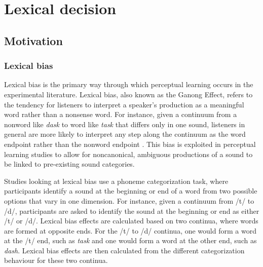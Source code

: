 
\chapter{Lexical decision}


\section{Motivation}

\subsection{Lexical bias}

Lexical bias is the primary way through which perceptual learning occurs in the experimental literature.  Lexical bias, also known as the Ganong Effect, refers to the tendency for listeners to interpret a speaker's production as a meaningful word rather than a nonsense word.  For instance, given a continuum from a nonword like \emph{dask} to word like \emph{task} that differs only in one sound, listeners in general are more likely to interpret any step along the continuum as the word endpoint rather than the nonword endpoint \citep{Ganong1980}. This bias is exploited in perceptual learning studies to allow for noncanonical, ambiguous productions of a sound to be linked to pre-existing sound categories.

Studies looking at lexical bias use a phoneme categorization task, where participants identify a sound at the beginning or end of a word from two possible options that vary in one dimension.  For instance, given a continuum from /t/ to /d/, participants are asked to identify the sound at the beginning or end as either /t/ or /d/.  Lexical bias effects are calculated based on two continua, where words are formed at opposite ends.  For the /t/ to /d/ continua, one would form a word at the /t/ end, such as \emph{task} and one would form a word at the other end, such as \emph{dash}.  Lexical bias effects are then calculated from the different categorization behaviour for these two continua.

